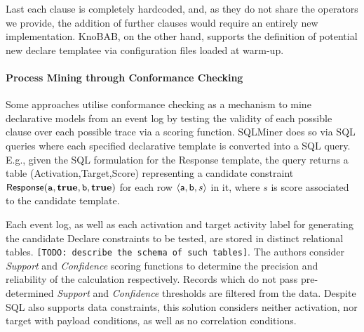 Last each clause is completely hardcoded, and, as they do not share the operators we provide, the addition of further clauses would require an entirely new implementation. KnoBAB, on the other hand, supports the definition of potential new declare templatee via configuration files loaded at warm-up. %




\paragraph*{Process Mining through Conformance Checking}
Some approaches utilise conformance checking as a mechanism to mine declarative {models}  from an event log {by testing the validity of each possible clause over each possible trace} via a scoring function. SQLMiner \cite{SchonigRCJM16} {does so via} SQL queries \cite{Schonig15} {where e}ach specified declarative {template} %
{is} converted into a SQL query. E.g., given the SQL formulation for the \textsf{Response} template, the query returns a table \textsf{(Activation,Target,Score)} representing a candidate constraint $\textsf{Response}(\texttt{a},\textbf{true},\texttt{b},\textbf{true})$ for each row $\braket{\textsf{a},\textsf{b},s}$ in it, where $s$ is   score associated to the candidate template.

Each event log, as well as each activation and target activity label for generating the candidate Declare constraints to be tested, are stored in distinct relational tables. \texttt{\color{red}[TODO: describe the schema of such tables]}. The authors consider 
\emph{Support} and \emph{Confidence} scoring functions to determine the precision and reliability of the calculation respectively. Records which do not pass pre-determined \emph{Support} and \emph{Confidence} thresholds are filtered from the data. {Despite } SQL also supports data constraints, this solution considers neither activation, nor target %
with payload conditions, as well as no correlation conditions.

